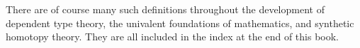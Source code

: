 \begin{rmk}
  \begin{center}
    \begin{minipage}{.45\textwidth}
      \begin{prooftree}
      \end{prooftree}
    \end{minipage}
    \begin{minipage}{.45\textwidth}
      \begin{prooftree}
      \end{prooftree}
    \end{minipage}
  \end{center}
  There are of course many such definitions throughout the development of dependent type theory, the univalent foundations of mathematics, and synthetic homotopy theory. They are all included in the index at the end of this book.
\end{rmk}

